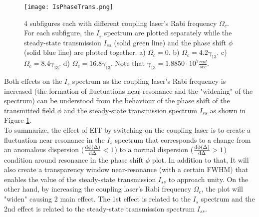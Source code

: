 \begin{figure}[h!]
    \centering
    \texttt{[image: IsPhaseTrans.png]}
    \caption{4 subfigures each with different coupling laser's Rabi frequency $\Omega_{c}$. For each subfigure, the $I_{s}$ spectrum are plotted separately while the steady-state transmission $I_{ss}$ (solid green line) and the phase shift $\phi$ (solid blue line) are plotted together. a) $\Omega_{c} = 0$. b) $\Omega_{c} = 4.2\gamma_{13}$. c) $\Omega_{c} = 8.4\gamma_{13}$. d) $\Omega_{c} = 16.8\gamma_{13}$. Note that $\gamma_{13} = 1.8850 \cdot 10^{7} \frac{rad}{sec}$.}
    \label{fig: Is compared to transmission & phase shift}
\end{figure}

Both effects on the $I_{s}$ spectrum as the coupling laser's Rabi frequency is increased (the formation of fluctuations near-resonance and the "widening" of the spectrum) can be understood from the behaviour of the phase shift of the transmitted field $\phi$ and the steady-state transmission spectrum $I_{ss}$ as shown in Figure \ref{fig: Is compared to transmission & phase shift}.\\


To summarize, the effect of EIT by switching-on the coupling laser is to create a fluctuation near resonance in the $I_{s}$ spectrum that corresponds to a change from an anomalous dispersion ($\dv{\phi(\Delta)}{\Delta} < 1$) to a normal dispersion ($\dv{\phi(\Delta)}{\Delta} > 1$) condition around resonance in the phase shift $\phi$ plot. In addition to that, It will also create a transparency window near-resonance (with a certain FWHM) that enables the value of the steady-state transmission $I_{ss}$ to approach unity. On the other hand, by increasing the coupling laser's Rabi frequency $\Omega_{c}$, the plot will "widen" causing 2 main effect. The 1st effect is related to the $I_{s}$ spectrum and the 2nd effect is related to the steady-state transmission spectrum $I_{ss}$.\\


